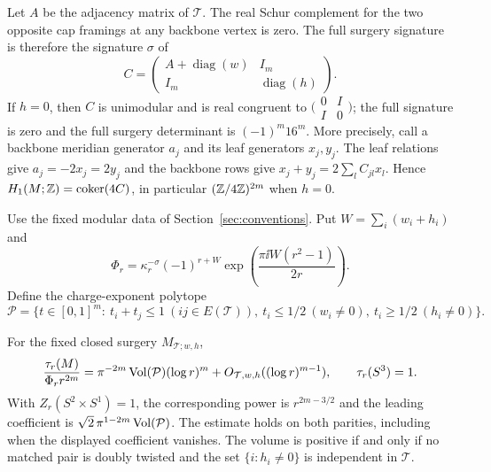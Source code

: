Let \(A\) be the adjacency matrix of \(\mathcal T\). The real Schur complement for the two opposite cap framings at any backbone vertex is zero. The full surgery signature is therefore the signature \(\sigma\) of
\[
 C=\begin{pmatrix}A+\operatorname{diag}(w)&I_m\\ I_m&\operatorname{diag}(h)\end{pmatrix}.
\]
If \(h=0\), then \(C\) is unimodular and is real congruent to
\(\bigl(\begin{smallmatrix}0&I\\ I&0\end{smallmatrix}\bigr)\); the full signature is zero and the full surgery determinant is \((-1)^m16^m\). More precisely, call a backbone meridian generator \(a_j\) and its leaf generators \(x_j,y_j\). The leaf relations give \(a_j=-2x_j=2y_j\) and the backbone rows give \(x_j+y_j=2\sum_l C_{jl}x_l\). Hence \(H_1(M;\mathbb Z)=\operatorname{coker}(4C)\), in particular \((\mathbb Z/4\mathbb Z)^{2m}\) when \(h=0\).

Use the fixed modular data of Section~\ref{sec:conventions}. Put \(W=\sum_i(w_i+h_i)\) and
\[
 \Phi_r=\kappa_r^{-\sigma}(-1)^{r+W}
         \exp\!\left(\frac{\pi\ii W(r^2-1)}{2r}\right).
\]
Define the charge-exponent polytope
\[
 \mathcal P=\{t\in[0,1]^m:\ t_i+t_j\le1\ (ij\in E(\mathcal T)),\
       t_i\le1/2\ (w_i\ne0),\ t_i\ge1/2\ (h_i\ne0)\}.
\]

\begin{theorem}\label{thm:corona}
For the fixed closed surgery \(M_{\mathcal T;w,h}\),
\[
 \frac{\tau_r(M)}{\Phi_r r^{2m}}
       =\pi^{-2m}\operatorname{Vol}(\mathcal P)(\log r)^m
          +O_{\mathcal T,w,h}((\log r)^{m-1}),
 \qquad \tau_r(S^3)=1.
\]
With \(Z_r(S^2\times S^1)=1\), the corresponding power is \(r^{2m-3/2}\) and the leading coefficient is \(\sqrt 2\,\pi^{1-2m}\operatorname{Vol}(\mathcal P)\). The estimate holds on both parities, including when the displayed coefficient vanishes. The volume is positive if and only if no matched pair is doubly twisted and the set \(\{i:h_i\ne0\}\) is independent in \(\mathcal T\).
\end{theorem}

